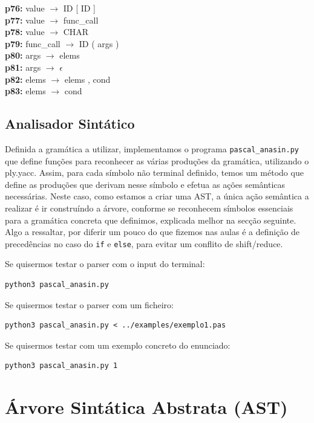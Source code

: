 \documentclass[12pt,a4paper]{report}
\begin{document}
\begin{tabbing}
\textbf{p76:} \> value \(\to\) ID [ ID ] \\
\textbf{p77:} \> value \(\to\) func\_call \\
\textbf{p78:} \> value \(\to\) CHAR \\
\textbf{p79:} \> func\_call \(\to\) ID ( args ) \\
\textbf{p80:} \> args \(\to\) elems \\
\textbf{p81:} \> args \(\to\) \(\epsilon\) \\
\textbf{p82:} \> elems \(\to\) elems , cond \\
\textbf{p83:} \> elems \(\to\) cond \\
\end{tabbing}

\section{Analisador Sintático}
Definida a gramática a utilizar, implementamos o programa \texttt{pascal\_anasin.py} que define funções para reconhecer as várias produções da gramática, utilizando o ply.yacc.
Assim, para cada símbolo não terminal definido, temos um método que define as produções que derivam nesse símbolo e efetua as ações semânticas necessárias.
Neste caso, como estamos a criar uma AST, a única ação semântica a realizar é ir construíndo a árvore, conforme se reconhecem símbolos essenciais para a gramática concreta que definimos, explicada melhor na secção seguinte.
Algo a ressaltar, por diferir um pouco do que fizemos nas aulas é a definição de precedências no caso do \texttt{if} e \texttt{else}, para evitar um conflito de shift/reduce.

\vspace{1em}

Se quisermos testar o parser com o input do terminal:
\begin{verbatim}
python3 pascal_anasin.py
\end{verbatim}

Se quisermos testar o parser com um ficheiro:
\begin{verbatim}
python3 pascal_anasin.py < ../examples/exemplo1.pas
\end{verbatim}

Se quisermos testar com um exemplo concreto do enunciado:
\begin{verbatim}
python3 pascal_anasin.py 1
\end{verbatim}

\chapter{Árvore Sintática Abstrata (AST)}
\end{document}
